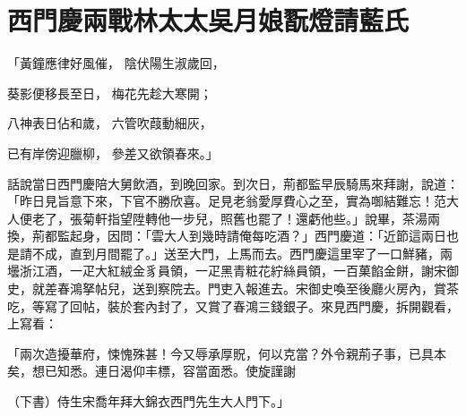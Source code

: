 %

\chapter{西門慶兩戰林太太\KG 吳月娘翫燈請藍氏}


\begin{showcontents}{}




「黃鐘應律好風催，  陰伏陽生淑歲回，

葵影便移長至日，  梅花先趁大寒開；

八神表日佔和歲，  六管吹葭動細灰，

已有岸傍迎臘柳，  參差又欲領春來。」

話說當日西門慶陪大舅飲酒，到晚回家。到次日，荊都監早辰騎馬來拜謝，說道：「昨日見旨意下來，下官不勝欣喜。足見老翁愛厚費心之至，實為啣結難忘！范大人便老了，張菊軒指望陞轉他一步兒，照舊也罷了！還虧他些。」說畢，茶湯兩換，荊都監起身，因問：「雲大人到幾時請俺每吃酒？」西門慶道：「近節這兩日也是請不成，直到月間罷了。」送至大門，上馬而去。西門慶這里宰了一口鮮豬，兩壜浙江酒，一疋大紅絨金豸員領，一疋黑青粧花紵絲員領，一百菓餡金餅，謝宋御史，就差春鴻拏帖兒，送到察院去。門吏入報進去。宋御史喚至後廳火房內，賞茶吃，等寫了回帖，裝於套內封了，又賞了春鴻三錢銀子。來見西門慶，拆開觀看，上寫看：

「兩次造擾華府，悚愧殊甚！今又辱承厚貺，何以克當？外令親荊子事，已具本矣，想已知悉。連日渴仰丰標，容當面悉。使旋謹謝

（下書）侍生宋喬年拜大錦衣西門先生大人門下。」


\end{showcontents}
